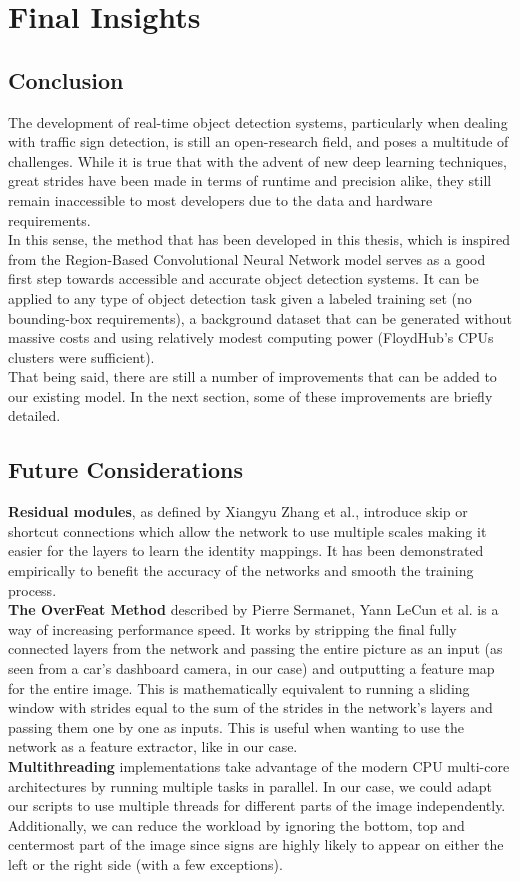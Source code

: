 \chapter*{Final Insights}
\section{Conclusion}
The development of real-time object detection systems, particularly when dealing with traffic sign detection, is still an open-research field, and poses a multitude of challenges. While it is true that with the advent of new deep learning techniques, great strides have been made in terms of runtime and precision alike, they still remain inaccessible to most developers due to the data and hardware requirements.\\
In this sense, the method that has been developed in this thesis, which is inspired from the Region-Based Convolutional Neural Network model \cite{rcnn} serves as a good first step towards accessible and accurate object detection systems. It can be applied to any type of object detection task given a labeled training set (no bounding-box requirements), a background dataset that can be generated without massive costs and using relatively modest computing power (FloydHub's CPUs clusters were sufficient).\\
That being said, there are still a number of improvements that can be added to our existing model. In the next section, some of these improvements are briefly detailed.
\section{Future Considerations}
\textbf{Residual modules}, as defined by Xiangyu Zhang et al.\cite{resNet}, introduce skip or shortcut connections which allow the network to use multiple scales making it easier for the layers to learn the identity mappings. It has been demonstrated empirically to benefit the accuracy of the networks and smooth the training process.\\
\textbf{The OverFeat Method} described by Pierre Sermanet, Yann LeCun et al. \cite{overfeat} is a way of increasing performance speed. It works by stripping the final fully connected layers from the network and passing the entire picture as an input (as seen from a car's dashboard camera, in our case) and outputting a feature map for the entire image. This is mathematically equivalent to running a sliding window with strides equal to the sum of the strides in the network's layers and passing them one by one as inputs. This is useful when wanting to use the network as a feature extractor, like in our case.\\
\textbf{Multithreading} implementations take advantage of the modern CPU multi-core architectures by running multiple tasks in parallel. In our case, we could adapt our scripts to use multiple threads for different parts of the image independently. Additionally, we can reduce the workload by ignoring the bottom, top and centermost part of the image since signs are highly likely to appear on either the left or the right side (with a few exceptions).